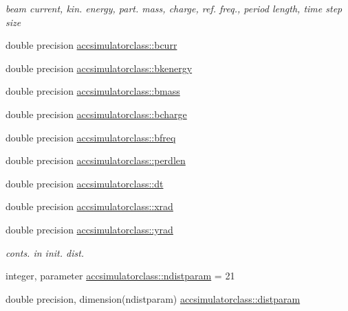 \textbf{ }\par
{\em beam current, kin. energy, part. mass, charge, ref. freq., period length, time step size }\begin{DoxyCompactItemize}
\item 
double precision \mbox{\hyperlink{namespaceaccsimulatorclass_a6fc5d39764a136b9e0748e3f7f130a45}{accsimulatorclass\+::bcurr}}
\item 
double precision \mbox{\hyperlink{namespaceaccsimulatorclass_a7ef66bd559d23461f9309d1b6b68af7d}{accsimulatorclass\+::bkenergy}}
\item 
double precision \mbox{\hyperlink{namespaceaccsimulatorclass_a01b613622328ba96dda4713ebd322485}{accsimulatorclass\+::bmass}}
\item 
double precision \mbox{\hyperlink{namespaceaccsimulatorclass_a010a96d950e24cf02277e621d90da69d}{accsimulatorclass\+::bcharge}}
\item 
double precision \mbox{\hyperlink{namespaceaccsimulatorclass_acc764ececa5e033fc6e23a807dec286c}{accsimulatorclass\+::bfreq}}
\item 
double precision \mbox{\hyperlink{namespaceaccsimulatorclass_a6b0f4b414cc1d61ea6ff0b558a116404}{accsimulatorclass\+::perdlen}}
\item 
double precision \mbox{\hyperlink{namespaceaccsimulatorclass_a75bc9f035300456d55f46abe5272e8c2}{accsimulatorclass\+::dt}}
\item 
double precision \mbox{\hyperlink{namespaceaccsimulatorclass_a0ac072649cfeb3a33d639154d38dea2b}{accsimulatorclass\+::xrad}}
\item 
double precision \mbox{\hyperlink{namespaceaccsimulatorclass_a9dbe475946e3dcfce115620500c6a0b4}{accsimulatorclass\+::yrad}}
\end{DoxyCompactItemize}

\textbf{ }\par
{\em conts. in init. dist. }\begin{DoxyCompactItemize}
\item 
integer, parameter \mbox{\hyperlink{namespaceaccsimulatorclass_a47c42ba384198193c23d4149fea01e14}{accsimulatorclass\+::ndistparam}} = 21
\item 
double precision, dimension(ndistparam) \mbox{\hyperlink{namespaceaccsimulatorclass_a93766a3c8ca80b873798adda649aec53}{accsimulatorclass\+::distparam}}
\end{DoxyCompactItemize}

